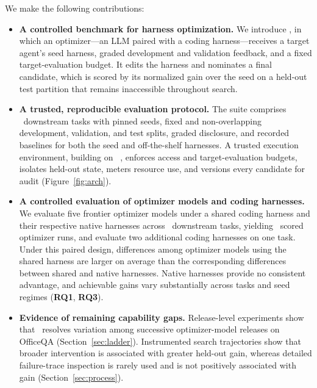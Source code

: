 We make the following contributions:

\begin{itemize}[leftmargin=*,itemsep=2pt,topsep=3pt]

    \item \textbf{A controlled benchmark for harness optimization.}
    We introduce \heb, in which an optimizer---an LLM paired with a
    coding harness---receives a target agent's seed harness, graded
    development and validation feedback, and a fixed target-evaluation
    budget. It edits the harness and nominates a final candidate, which
    is scored by its normalized gain over the seed on a held-out test
    partition that remains inaccessible throughout search.

    \item \textbf{A trusted, reproducible evaluation protocol.}
    The suite comprises \NumSuiteTasks\ downstream tasks with pinned
    seeds, fixed and non-overlapping development, validation, and test
    splits, graded disclosure, and recorded baselines for both the seed
    and off-the-shelf harnesses. A trusted execution environment,
    building on \vero\ \citep{ursekar2026vero}, enforces access and
    target-evaluation budgets, isolates held-out state, meters resource
    use, and versions every candidate for audit
    (Figure~\ref{fig:arch}).

    \item \textbf{A controlled evaluation of optimizer models and coding
    harnesses.}
    We evaluate five frontier optimizer models under a shared coding
    harness and their respective native harnesses across
    \NumPaperTasks\ downstream tasks, yielding \NumScoredCells\ scored
    optimizer runs, and evaluate two additional coding harnesses on one
    task. Under this paired design, differences among optimizer models
    using the shared harness are larger on average than the corresponding
    differences between shared and native harnesses. Native harnesses
    provide no consistent advantage, and achievable gains vary
    substantially across tasks and seed regimes (\textbf{RQ1},
    \textbf{RQ3}).

    \item \textbf{Evidence of remaining capability gaps.}
    Release-level experiments show that \heb\ resolves variation among
    successive optimizer-model releases on OfficeQA
    (Section~\ref{sec:ladder}). Instrumented search trajectories show
    that broader intervention is associated with greater held-out gain,
    whereas detailed failure-trace inspection is rarely used and is not
    positively associated with gain
    (Section~\ref{sec:process}).

\end{itemize}

